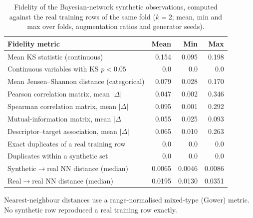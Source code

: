 \begin{table}[htbp]
\centering
\caption{Fidelity of the Bayesian-network synthetic observations, computed against the real training rows of the same fold ($k=2$; mean, min and max over folds, augmentation ratios and generator seeds).}
\label{tab:fidelity}
\footnotesize
\begin{tabular}{lrrr}
\toprule
\textbf{Fidelity metric} & \textbf{Mean} & \textbf{Min} & \textbf{Max} \\
\midrule
Mean KS statistic (continuous) & 0.154 & 0.095 & 0.198 \\
Continuous variables with KS $p<0.05$ & 0.0 & 0.0 & 0.0 \\
Mean Jensen--Shannon distance (categorical) & 0.079 & 0.028 & 0.170 \\
Pearson correlation matrix, mean $|\Delta|$ & 0.047 & 0.002 & 0.346 \\
Spearman correlation matrix, mean $|\Delta|$ & 0.095 & 0.001 & 0.292 \\
Mutual-information matrix, mean $|\Delta|$ & 0.055 & 0.025 & 0.093 \\
Descriptor--target association, mean $|\Delta|$ & 0.065 & 0.010 & 0.263 \\
Exact duplicates of a real training row & 0.0 & 0.0 & 0.0 \\
Duplicates within a synthetic set & 0.0 & 0.0 & 0.0 \\
Synthetic$\rightarrow$real NN distance (median) & 0.0065 & 0.0046 & 0.0086 \\
Real$\rightarrow$real NN distance (median) & 0.0195 & 0.0130 & 0.0351 \\
\bottomrule
\end{tabular}
\par\vspace{2pt}\begin{minipage}{\linewidth}\scriptsize Nearest-neighbour distances use a range-normalised mixed-type (Gower) metric. No synthetic row reproduced a real training row exactly.\end{minipage}
\end{table}